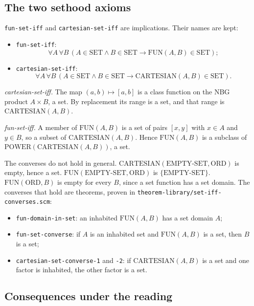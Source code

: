 \subsection{The two sethood axioms}

\texttt{fun-set-iff} and \texttt{cartesian-set-iff} are implications.
Their names are kept:
\begin{itemize}
\item \texttt{fun-set-iff}:
  \[\forall A\,\forall B\,(A\in\mathrm{SET}\wedge B\in\mathrm{SET}\to\mathrm{FUN}(A,B)\in\mathrm{SET});\]
\item \texttt{cartesian-set-iff}:
  \[\forall A\,\forall B\,(A\in\mathrm{SET}\wedge B\in\mathrm{SET}\to\mathrm{CARTESIAN}(A,B)\in\mathrm{SET}).\]
\end{itemize}
\emph{cartesian-set-iff.}  The map $(a,b)\mapsto[a,b]$ is a class
function on the NBG product $A\times B$, a set.  By replacement its
range is a set, and that range is $\mathrm{CARTESIAN}(A,B)$.

\emph{fun-set-iff.}  A member of $\mathrm{FUN}(A,B)$ is a set of pairs
$[x,y]$ with $x\in A$ and $y\in B$, so a subset of
$\mathrm{CARTESIAN}(A,B)$.  Hence $\mathrm{FUN}(A,B)$ is a subclass of
$\mathrm{POWER}(\mathrm{CARTESIAN}(A,B))$, a set.

The converses do not hold in general.  $\mathrm{CARTESIAN}(\mathrm{EMPTY\text{-}SET},\mathrm{ORD})$
is empty, hence a set.  $\mathrm{FUN}(\mathrm{EMPTY\text{-}SET},\mathrm{ORD})$
is $\{\mathrm{EMPTY\text{-}SET}\}$.  $\mathrm{FUN}(\mathrm{ORD},B)$ is
empty for every $B$, since a set function has a set domain.  The
converses that hold are theorems, proven in
\texttt{theorem-library/set-iff-converses.scm}:
\begin{itemize}
\item \texttt{fun-domain-in-set}: an inhabited $\mathrm{FUN}(A,B)$ has a
  set domain $A$;
\item \texttt{fun-set-converse}: if $A$ is an inhabited set and
  $\mathrm{FUN}(A,B)$ is a set, then $B$ is a set;
\item \texttt{cartesian-set-converse-1} and \texttt{-2}: if
  $\mathrm{CARTESIAN}(A,B)$ is a set and one factor is inhabited, the
  other factor is a set.
\end{itemize}

\subsection{Consequences under the reading}

